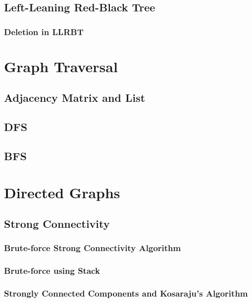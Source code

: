 \documentclass{report}
\begin{document}
\section{Left-Leaning Red-Black Tree}

\subsection{Deletion in LLRBT}


\chapter{Graph Traversal}

\section{Adjacency Matrix and List}

\section{DFS}

\section{BFS}


\chapter{Directed Graphs}

\section{Strong Connectivity}

\subsection{Brute-force Strong Connectivity Algorithm}

\subsection{Brute-force using Stack}

\subsection{Strongly Connected Components and Kosaraju's Algorithm}
\end{document}

